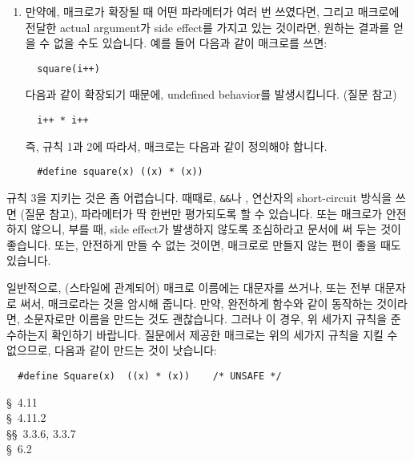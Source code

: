 \begin{faq}
\begin{enumerate}
	\item 만약에, 매크로가 확장될 때 어떤 파라메터가 여러 번 쓰였다면, 
          그리고 매크로에 전달한 actual argument가 side effect를 가지고 있는
          것이라면, 원하는 결과를 얻을 수 없을 수도 있습니다. 예를 들어 다음과
          같이 매크로를 쓰면:
\begin{verbatim}
  square(i++)
\end{verbatim}
	  \noindent 다음과 같이 확장되기 때문에, undefined behavior를
          발생시킵니다. (질문  참고)
\begin{verbatim}
  i++ * i++
\end{verbatim}
	  \noindent 즉, 규칙 1과 2에 따라서,  매크로는 다음과 같이
          정의해야 합니다.
\begin{verbatim}
  #define square(x)	((x) * (x))
\end{verbatim}
\end{enumerate}

	  규칙 3을 지키는 것은 좀 어렵습니다. 때때로, \verb+&&+나 \TT{||},
           연산자의 short-circuit 방식을 쓰면 (질문  참고), 파라메터가
          딱 한번만 평가되도록 할 수 있습니다. 또는 매크로가 안전하지 않으니,
          부를 때, side effect가 발생하지 않도록 조심하라고 문서에 써 두는 것이
          좋습니다. 또는, 안전하게 만들 수 없는 것이면, 매크로로 만들지 않는
          편이 좋을 때도 있습니다.

          일반적으로, (스타일에 관계되어) 매크로 이름에는 대문자를 쓰거나, 또는
          전부 대문자로 써서, 매크로라는 것을 암시해 줍니다. 만약, 완전하게
          함수와 같이 동작하는 것이라면, 소문자로만 이름을 만드는 것도 
          괜찮습니다. 그러나 이 경우, 위 세가지 규칙을 준수하는지 확인하기
          바랍니다. 질문에서 제공한 매크로는 위의 세가지 규칙을 지킬 수 없으므로,
          다음과 같이 만드는 것이 낫습니다:
\begin{verbatim}
  #define Square(x)  ((x) * (x))    /* UNSAFE */
\end{verbatim}

\R
	\cite{kr1} \S\ 4.11  \\
        \cite{kr2} \S\ 4.11.2  \\
        \cite{hs} \S\S\ 3.3.6, 3.3.7  \\
        \cite{ctp} \S\ 6.2 
\end{faq}
  

